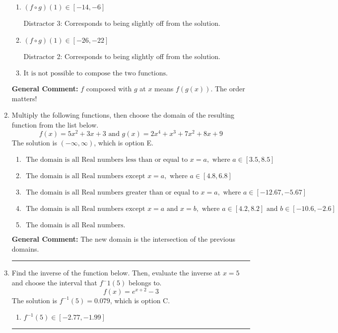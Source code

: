 \documentclass{extbook}[14pt]
\newcommand{\litem}[1]{\item #1

\rule{\textwidth}{0.4pt}}
\begin{document}
\begin{enumerate}
{\begin{enumerate}[label=\Alph*.]
* This is the correct solution
\item \( (f \circ g)(1) \in [-14, -6] \)

 Distractor 3: Corresponds to being slightly off from the solution.
\item \( (f \circ g)(1) \in [-26, -22] \)

 Distractor 2: Corresponds to being slightly off from the solution.
\item \( \text{It is not possible to compose the two functions.} \)


\end{enumerate}

\textbf{General Comment:} $f$ composed with $g$ at $x$ means $f(g(x))$. The order matters!
}
\litem{
Multiply the following functions, then choose the domain of the resulting function from the list below.
\[ f(x) = 5x^{2} +3 x + 3 \text{ and } g(x) = 2x^{4} + x^{3} +7 x^{2} +8 x + 9 \]The solution is \( (-\infty, \infty) \), which is option E.\begin{enumerate}[label=\Alph*.]
\item \( \text{ The domain is all Real numbers less than or equal to } x = a, \text{ where } a \in [3.5, 8.5] \)


\item \( \text{ The domain is all Real numbers except } x = a, \text{ where } a \in [4.8, 6.8] \)


\item \( \text{ The domain is all Real numbers greater than or equal to } x = a, \text{ where } a \in [-12.67, -5.67] \)


\item \( \text{ The domain is all Real numbers except } x = a \text{ and } x = b, \text{ where } a \in [4.2, 8.2] \text{ and } b \in [-10.6, -2.6] \)


\item \( \text{ The domain is all Real numbers. } \)


\end{enumerate}

\textbf{General Comment:} The new domain is the intersection of the previous domains.
}
\litem{
Find the inverse of the function below. Then, evaluate the inverse at $x = 5$ and choose the interval that $f^-1(5)$ belongs to.
\[ f(x) = e^{x+2}-3 \]The solution is \( f^{-1}(5) = 0.079 \), which is option C.\begin{enumerate}[label=\Alph*.]
\item \( f^{-1}(5) \in [-2.77, -1.99] \)


\end{enumerate}}
\end{enumerate}
\end{document}
